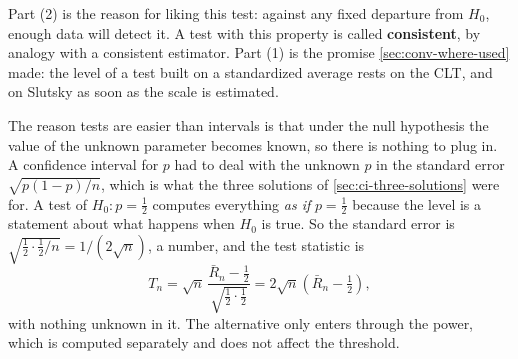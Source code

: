 Part (2) is the reason for liking this test: against any fixed departure from $H_0$, enough data will detect it.
A test with this property is called \textbf{consistent}, by analogy with a consistent estimator.
Part (1) is the promise \cref{sec:conv-where-used} made: the level of a test built on a standardized average rests on the CLT, and on Slutsky as soon as the scale is estimated.

\begin{intuition}
The reason tests are easier than intervals is that under the null hypothesis the value of the unknown parameter becomes known, so there is nothing to plug in.
A confidence interval for $p$ had to deal with the unknown $p$ in the standard error $\sqrt{p(1-p)/n}$, which is what the three solutions of \cref{sec:ci-three-solutions} were for.
A test of $H_0: p = \frac12$ computes everything \textit{as if} $p = \frac12$ because the level is a statement about what happens when $H_0$ is true.
So the standard error is $\sqrt{\frac12 \cdot \frac12 / n} = 1/(2\sqrt{n})$, a number, and the test statistic is
\[
T_n = \sqrt{n}\, \frac{\bar{R}_n - \frac12}{\sqrt{\frac12 \cdot \frac12}} = 2\sqrt{n}\left(\bar{R}_n - \tfrac12\right),
\]
with nothing unknown in it.
The alternative only enters through the power, which is computed separately and does not affect the threshold.
\end{intuition}

